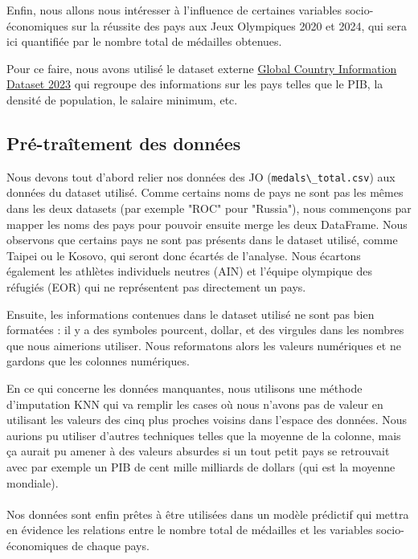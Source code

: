 \documentclass{article}
\begin{document}
Enfin, nous allons nous intéresser à l'influence de certaines variables socio-économiques sur la réussite des pays aux Jeux Olympiques 2020 et 2024, qui sera ici quantifiée par le nombre total de médailles obtenues.

Pour ce faire, nous avons utilisé le dataset externe \href{https://www.kaggle.com/datasets/nelgiriyewithana/countries-of-the-world-2023}{Global Country Information Dataset 2023} qui regroupe des informations sur les pays telles que le PIB, la densité de population, le salaire minimum, etc.

\subsection{Pré-traîtement des données}

Nous devons tout d'abord relier nos données des JO (\verb|medals\_total.csv|) aux données du dataset utilisé. Comme certains noms de pays ne sont pas les mêmes dans les deux datasets (par exemple "ROC" pour "Russia"), nous commençons par mapper les noms des pays pour pouvoir ensuite merge les deux DataFrame. Nous observons que certains pays ne sont pas présents dans le dataset utilisé, comme Taipei ou le Kosovo, qui seront donc écartés de l'analyse. Nous écartons également les athlètes individuels neutres (AIN) et l'équipe olympique des réfugiés (EOR) qui ne représentent pas directement un pays.

Ensuite, les informations contenues dans le dataset utilisé ne sont pas bien formatées : il y a des symboles pourcent, dollar, et des virgules dans les nombres que nous aimerions utiliser. Nous reformatons alors les valeurs numériques et ne gardons que les colonnes numériques.

En ce qui concerne les données manquantes, nous utilisons une méthode d'imputation KNN qui va remplir les cases où nous n'avons pas de valeur en utilisant les valeurs des cinq plus proches voisins dans l'espace des données. Nous aurions pu utiliser d'autres techniques telles que la moyenne de la colonne, mais ça aurait pu amener à des valeurs absurdes si un tout petit pays se retrouvait avec par exemple un PIB de cent mille milliards de dollars (qui est la moyenne mondiale).
\\\\
\indent Nos données sont enfin prêtes à être utilisées dans un modèle prédictif qui mettra en évidence les relations entre le nombre total de médailles et les variables socio-économiques de chaque pays.
\end{document}
